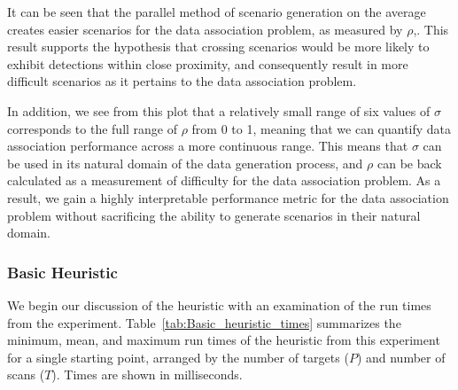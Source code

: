 \documentclass[journal]{IEEEtran}
\begin{document}
It can be seen that the parallel method of scenario generation on the average creates easier scenarios for the data association problem, as measured by $\rho$,. This result supports the hypothesis that crossing scenarios would be more likely to exhibit detections within close proximity, and consequently result in more difficult scenarios as it pertains to the data association problem. 

In addition, we see from this plot that a relatively small range of six values of $\sigma$ corresponds to the full range of $\rho$ from 0 to 1, meaning that we can quantify data association performance across a more continuous range. This means that $\sigma$ can be used in its natural domain of the data generation process, and $\rho$ can be back calculated as a measurement of difficulty for the data association problem. As a result, we gain a highly interpretable performance metric for the data association problem without sacrificing the ability to generate scenarios in their natural domain. 

\subsubsection{Basic Heuristic}
We begin our discussion of the heuristic with an examination of the run times from the experiment. Table~\ref{tab:Basic_heuristic_times} summarizes the minimum, mean, and maximum run times of the heuristic from this experiment for a single starting point, arranged by the number of targets ($P$) and number of scans ($T$). Times are shown in milliseconds. 
\end{document}
